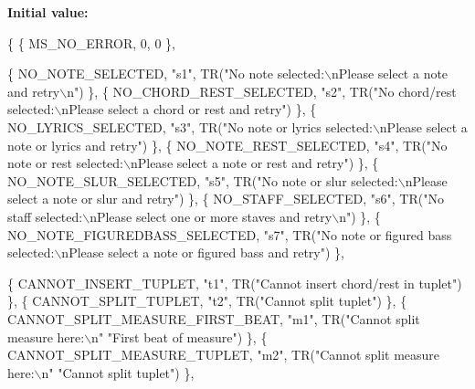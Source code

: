{\bfseries Initial value\+:}
\begin{DoxyCode}
\{
      \{ MS\_NO\_ERROR,                     0,    0                                                           
                      \},

      \{ NO\_NOTE\_SELECTED,                \textcolor{stringliteral}{"s1"}, TR(\textcolor{stringliteral}{"No note selected:\(\backslash\)nPlease select a note and retry\(\backslash\)n"})   
                      \},
      \{ NO\_CHORD\_REST\_SELECTED,          \textcolor{stringliteral}{"s2"}, TR(\textcolor{stringliteral}{"No chord/rest selected:\(\backslash\)nPlease select a chord or rest
       and retry"})      \},
      \{ NO\_LYRICS\_SELECTED,              \textcolor{stringliteral}{"s3"}, TR(\textcolor{stringliteral}{"No note or lyrics selected:\(\backslash\)nPlease select a note or
       lyrics and retry"}) \},
      \{ NO\_NOTE\_REST\_SELECTED,           \textcolor{stringliteral}{"s4"}, TR(\textcolor{stringliteral}{"No note or rest selected:\(\backslash\)nPlease select a note or rest
       and retry"})     \},
      \{ NO\_NOTE\_SLUR\_SELECTED,           \textcolor{stringliteral}{"s5"}, TR(\textcolor{stringliteral}{"No note or slur selected:\(\backslash\)nPlease select a note or slur
       and retry"})     \},
      \{ NO\_STAFF\_SELECTED,               \textcolor{stringliteral}{"s6"}, TR(\textcolor{stringliteral}{"No staff selected:\(\backslash\)nPlease select one or more staves and
       retry\(\backslash\)n"})      \},
      \{ NO\_NOTE\_FIGUREDBASS\_SELECTED,    \textcolor{stringliteral}{"s7"}, TR(\textcolor{stringliteral}{"No note or figured bass selected:\(\backslash\)nPlease select a note
       or figured bass and retry"}) \},

      \{ CANNOT\_INSERT\_TUPLET,            \textcolor{stringliteral}{"t1"}, TR(\textcolor{stringliteral}{"Cannot insert chord/rest in tuplet"})                    
                      \},
      \{ CANNOT\_SPLIT\_TUPLET,             \textcolor{stringliteral}{"t2"}, TR(\textcolor{stringliteral}{"Cannot split tuplet"})                                   
                      \},
      \{ CANNOT\_SPLIT\_MEASURE\_FIRST\_BEAT, \textcolor{stringliteral}{"m1"}, TR(\textcolor{stringliteral}{"Cannot split measure here:\(\backslash\)n"} \textcolor{stringliteral}{"First beat of measure"})  
                      \},
      \{ CANNOT\_SPLIT\_MEASURE\_TUPLET,     \textcolor{stringliteral}{"m2"}, TR(\textcolor{stringliteral}{"Cannot split measure here:\(\backslash\)n"} \textcolor{stringliteral}{"Cannot split tuplet"})    
                      \},


\end{DoxyCode}
